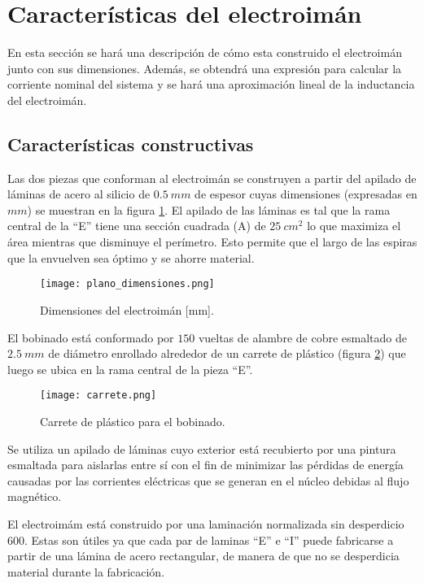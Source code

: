 \section{Características del electroimán} \label{section_disenio_electroimán}

En esta sección se hará una descripción de cómo esta construido el electroimán junto con sus dimensiones. Además, se obtendrá una expresión para calcular la corriente nominal del sistema y se hará una aproximación lineal de la inductancia del electroimán.
 
\subsection{Características constructivas}\label{section_caract_constructivas}

\noindent Las dos piezas que conforman al electroimán se construyen a partir del apilado de láminas de acero al silicio de $0.5\:mm$ de espesor cuyas dimensiones (expresadas en $mm$) se muestran en la figura \ref{fig:img_plano_dimensiones}. El apilado de las láminas es tal que la rama central de la “E” tiene una sección cuadrada (A) de $25\:cm^{2}$ lo que maximiza el área mientras que disminuye el perímetro. Esto permite que el largo de las espiras que la envuelven sea óptimo y se ahorre material.

\begin{figure}[H]
	\centering
	\texttt{[image: plano\_dimensiones.png]}
	\caption{Dimensiones del electroimán [mm].}
	\label{fig:img_plano_dimensiones}
\end{figure}

\noindent El bobinado está conformado por $150$ vueltas de alambre de cobre esmaltado de $2.5\:mm$ de diámetro enrollado alrededor de un carrete de plástico (figura \ref{fig:img_carrete}) que luego se ubica en la rama central de la pieza ``E''.

\begin{figure}[H]
	\centering
	\texttt{[image: carrete.png]}
	\caption{Carrete de plástico para el bobinado.}
	\label{fig:img_carrete}
\end{figure}


\noindent Se utiliza un apilado de láminas cuyo exterior está recubierto por una pintura esmaltada para aislarlas entre sí con el fin de minimizar las pérdidas de energía causadas por las corrientes eléctricas que se generan en el núcleo debidas al flujo magnético. 

\noindent El electroimám está construido por una laminación normalizada sin desperdicio 600. Estas son útiles ya que cada par de laminas ``E'' e ``I'' puede fabricarse a partir de una lámina de acero rectangular, de manera de que no se desperdicia material durante la fabricación. 



